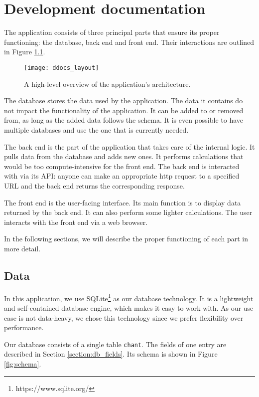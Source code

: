 \chapter{Development documentation}

The application consists of three principal parts that ensure its proper functioning: the database, back end and front end. Their interactions are
outlined in Figure \ref{fig:architecture}.

\begin{figure}[!h]
\centering
\texttt{[image: ddocs\_layout]}
\caption{A high-level overview of the application's architecture.}
\label{fig:architecture}
\end{figure}

The database stores the data used by the application. The data it contains do not impact the functionality of the application. It can be added
to or removed from, as long as the added data follows the schema. It is even possible to have multiple databases and use the one that is currently needed.

The back end is the part of the application that takes care of the internal logic. It pulls data from the database and adds new ones. It performs calculations
that would be too compute-intensive for the front end. The back end is interacted with via its API: anyone can make an appropriate http request
to a specified URL and the back end returns the corresponding response.

The front end is the user-facing interface. Its main function is to display data returned by the back end. It can also perform some lighter calculations.
The user interacts with the front end via a web browser.

In the following sections, we will describe the proper functioning of each part in more detail.

\section{Data}

In this application, we use SQLite\footnote{https://www.sqlite.org/} as our data\-base technology. It is a lightweight and self-contained database engine,
which makes it easy to work with. As our use case is not data-heavy, we chose this technology since we prefer flexibility over performance.

Our database consists of a single table \verb|chant|. The fields of one entry are described in Section \ref{section:db_fields}. Its schema is shown
in Figure \ref{fig:schema}.


